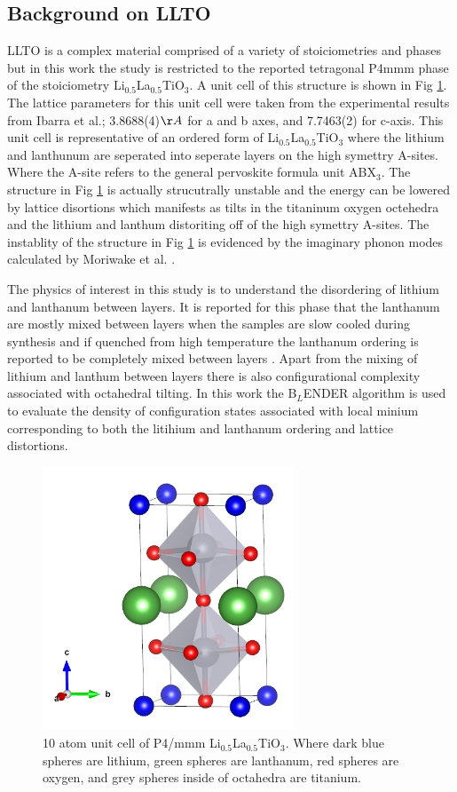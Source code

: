 \documentclass[aps,prl,reprint,superscriptaddress,showkeys]{revtex4-1}
\begin{document}
\subsection{Background on LLTO}
LLTO is a complex material comprised of a variety of stoiciometries and phases but in this work the study is restricted to the reported tetragonal P4mmm phase of the stoiciometry Li$_{0.5}$La$_{0.5}$TiO$_{3}$\cite{LLTOreview,P4mmmstrucuture}. A unit cell of this structure is shown in Fig \ref{LLTO_unit_cell}. The lattice parameters for this unit cell were taken from the experimental results from Ibarra et al.\cite{P4mmmstrucuture}; 3.8688(4)$\AA$ for a and b axes, and 7.7463(2) for c-axis.  This unit cell is representative of an ordered form of Li$_{0.5}$La$_{0.5}$TiO$_{3}$ where the lithium and lanthunum are seperated into seperate layers on the high symettry A-sites. Where the A-site refers to the general pervoskite formula unit ABX$_3$.  The structure in Fig \ref{LLTO_unit_cell} is actually strucutrally unstable and the energy can be lowered by lattice disortions which manifests as tilts in the titaninum oxygen octehedra and the lithium and lanthum distoriting off of the high symettry A-sites. The instablity of the structure in Fig \ref{LLTO_unit_cell} is evidenced by the imaginary phonon modes calculated by Moriwake et al. \cite{imaginary_phonons}.  

The physics of interest in this study is to understand the disordering of lithium and lanthanum between layers.  It is reported for this phase that the lanthanum are mostly mixed between layers when the samples are slow cooled during synthesis and if quenched from high temperature the lanthanum ordering is reported to be completely mixed between layers \cite{P4mmmstrucuture}. Apart from the mixing of lithium and lanthum between layers there is also configurational complexity associated with octahedral tilting. In this work the B$_L$ENDER algorithm is used to evaluate the density of configuration states associated with local minium corresponding to both the litihium and lanthanum ordering and lattice distortions.   
\begin{figure}[h!]
\includegraphics[width=7.5cm]{./figures/unit_cell_P4mmm_cropped.png}
\caption{10 atom unit cell of P4/mmm Li$_{0.5}$La$_{0.5}$TiO$_{3}$. Where dark blue spheres are lithium, green spheres are lanthanum, red spheres are oxygen, and grey spheres inside of octahedra are titanium.\label{LLTO_unit_cell}}
\end{figure}
\end{document}
